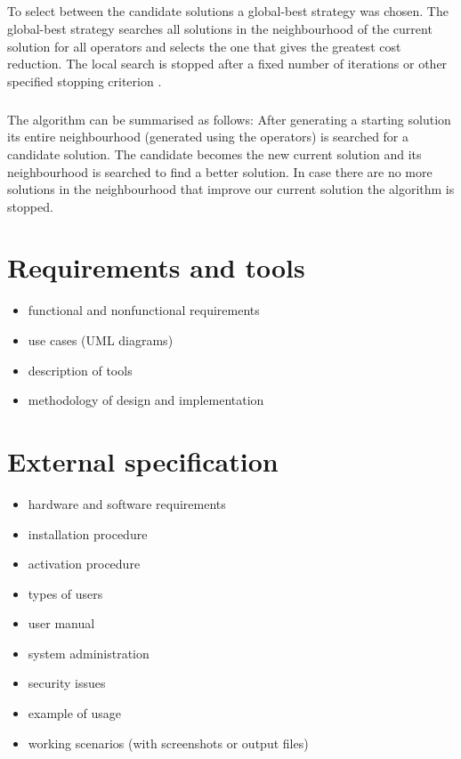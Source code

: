 \documentclass[a4paper,twoside,12pt]{book}
\begin{document}
\paragraph{}
To select between the candidate solutions a global-best strategy was chosen. The global-best strategy searches all solutions in the neighbourhood of the current solution for all operators and selects the one that gives the greatest cost reduction. The local search is stopped after a fixed number of iterations or other specified stopping criterion \cite{bib:article:LocalSearchLambda}. 
\paragraph{}
The algorithm can be summarised as follows: After generating a starting solution its entire neighbourhood (generated using the operators) is searched for a candidate solution. The candidate becomes the new current solution and its neighbourhood is searched to find a better solution. In case there are no more solutions in the neighbourhood that improve our current solution the algorithm is stopped.
\chapter{Requirements and tools}

\begin{itemize}
\item functional and nonfunctional requirements
\item use cases (UML diagrams)
\item description of tools
\item methodology of design and implementation
\end{itemize} 


\chapter{External specification}
\begin{itemize}
\item hardware and software requirements
\item installation procedure
\item activation procedure
\item types of users
\item user manual
\item system administration
\item security issues
\item example of usage
\item working scenarios (with screenshots or output files)
\end{itemize}
\end{document}
